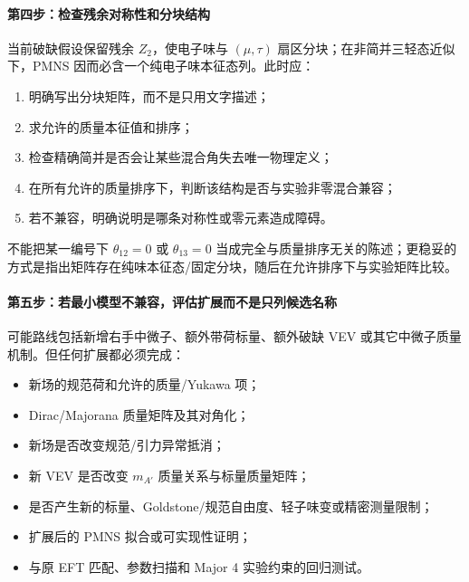 \documentclass[
]{article}
\providecommand{\tightlist}{%
  \setlength{\itemsep}{0pt}\setlength{\parskip}{0pt}}
\begin{document}
\paragraph{第四步：检查残余对称性和分块结构}\label{ux7b2cux56dbux6b65ux68c0ux67e5ux6b8bux4f59ux5bf9ux79f0ux6027ux548cux5206ux5757ux7ed3ux6784}

当前破缺假设保留残余 \(Z_2\)，使电子味与 \((\mu,\tau)\)
扇区分块；在非简并三轻态近似下，PMNS
因而必含一个纯电子味本征态列。此时应：

\begin{enumerate}
\def\labelenumi{\arabic{enumi}.}
\tightlist
\item
  明确写出分块矩阵，而不是只用文字描述；
\item
  求允许的质量本征值和排序；
\item
  检查精确简并是否会让某些混合角失去唯一物理定义；
\item
  在所有允许的质量排序下，判断该结构是否与实验非零混合兼容；
\item
  若不兼容，明确说明是哪条对称性或零元素造成障碍。
\end{enumerate}

不能把某一编号下 \(\theta_{12}=0\) 或 \(\theta_{13}=0\)
当成完全与质量排序无关的陈述；更稳妥的方式是指出矩阵存在纯味本征态/固定分块，随后在允许排序下与实验矩阵比较。

\paragraph{第五步：若最小模型不兼容，评估扩展而不是只列候选名称}\label{ux7b2cux4e94ux6b65ux82e5ux6700ux5c0fux6a21ux578bux4e0dux517cux5bb9ux8bc4ux4f30ux6269ux5c55ux800cux4e0dux662fux53eaux5217ux5019ux9009ux540dux79f0}

可能路线包括新增右手中微子、额外带荷标量、额外破缺 VEV
或其它中微子质量机制。但任何扩展都必须完成：

\begin{itemize}
\tightlist
\item
  新场的规范荷和允许的质量/Yukawa 项；
\item
  Dirac/Majorana 质量矩阵及其对角化；
\item
  新场是否改变规范/引力异常抵消；
\item
  新 VEV 是否改变 \(m_{A'}\) 质量关系与标量质量矩阵；
\item
  是否产生新的标量、Goldstone/规范自由度、轻子味变或精密测量限制；
\item
  扩展后的 PMNS 拟合或可实现性证明；
\item
  与原 EFT 匹配、参数扫描和 Major 4 实验约束的回归测试。
\end{itemize}
\end{document}
